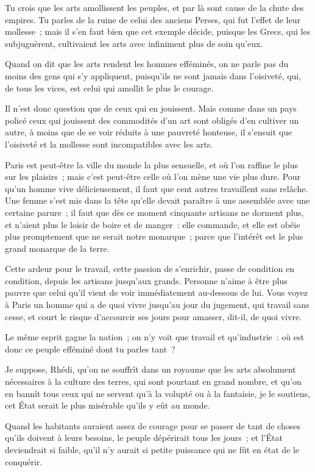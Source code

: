 \documentclass[french,twoside]{book} %
\begin{document}
Tu crois que les arts amollissent les peuples, et par là sont cause de la chute des empires. Tu parles de la ruine de celui des anciens Perses, qui fut l’effet de leur mollesse ; mais il s’en faut bien que cet exemple décide, puisque les Grecs, qui les subjuguèrent, cultivaient les arts avec infiniment plus de soin qu’eux.\par
Quand on dit que les arts rendent les hommes efféminés, on ne parle pas du moins des gens qui s’y appliquent, puisqu’ils ne sont jamais dans l’oisiveté, qui, de tous les vices, est celui qui amollit le plus le courage.\par
Il n’est donc question que de ceux qui en jouissent. Mais comme dans un pays policé ceux qui jouissent des commodités d’un art sont obligés d’en cultiver un autre, à moins que de se voir réduits à une pauvreté honteuse, il s’ensuit que l’oisiveté et la mollesse sont incompatibles avec les arts.\par
Paris est peut-être la ville du monde la plus sensuelle, et où l’on raffine le plus sur les plaisirs ; mais c’est peut-être celle où l’on mène une vie plus dure. Pour qu’un homme vive délicieusement, il faut que cent autres travaillent sans relâche. Une femme s’est mis dans la tête qu’elle devait paraître à une assemblée avec une certaine parure ; il faut que dès ce moment cinquante artisans ne dorment plus, et n’aient plus le loisir de boire et de manger : elle commande, et elle est obéie plus promptement que ne serait notre monarque ; parce que l’intérêt est le plus grand monarque de la terre.\par
Cette ardeur pour le travail, cette passion de s’enrichir, passe de condition en condition, depuis les artisans jusqu’aux grands. Personne n’aime à être plus pauvre que celui qu’il vient de voir immédiatement au-dessous de lui. Vous voyez à Paris un homme qui a de quoi vivre jusqu’au jour du jugement, qui travail sans cesse, et court le risque d’accourcir ses jours pour amasser, dit-il, de quoi vivre.\par
Le même esprit gagne la nation ; on n’y voit que travail et qu’industrie : où est donc ce peuple efféminé dont tu parles tant ?\par
Je suppose, Rhédi, qu’on ne souffrît dans un royaume que les arts absolument nécessaires à la culture des terres, qui sont pourtant en grand nombre, et qu’on en bannît tous ceux qui ne servent qu’à la volupté ou à la fantaisie, je le soutiens, cet État serait le plus misérable qu’ils y eût au monde.\par
Quand les habitants auraient assez de courage pour se passer de tant de choses qu’ils doivent à leurs besoins, le peuple dépérirait tous les jours ; et l’État deviendrait si faible, qu’il n’y aurait si petite puissance qui ne fût en état de le conquérir.\par
\end{document}
